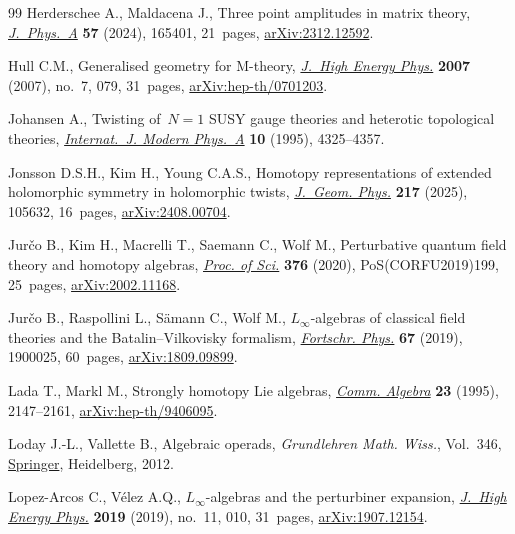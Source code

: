 \begin{thebibliography}{99}
Herderschee A., Maldacena J., Three point amplitudes in matrix theory,
 \href{https://doi.org/10.1088/1751-8121/ad389b}{\textit{J.~Phys.~A}}
 \textbf{57} (2024), 165401, 21~pages,
 \href{http://arxiv.org/abs/2312.12592}{arXiv:2312.12592}.

Hull C.M., Generalised geometry for {M}-theory,
 \href{https://doi.org/10.1088/1126-6708/2007/07/079}{\textit{J.~High Energy
 Phys.}} \textbf{2007} (2007), no.~7, 079, 31~pages,
 \href{http://arxiv.org/abs/hep-th/0701203}{arXiv:hep-th/0701203}.

Johansen A., Twisting of~{$N=1$} {SUSY} gauge theories and heterotic
 topological theories,
 \href{https://doi.org/10.1142/S0217751X9500200X}{\textit{Internat.~J. Modern
 Phys.~A}} \textbf{10} (1995), 4325--4357.

Jonsson D.S.H., Kim H., Young C.A.S., Homotopy representations of extended
 holomorphic symmetry in holomorphic twists,
 \href{https://doi.org/10.1016/j.geomphys.2025.105632}{\textit{J.~Geom.
 Phys.}} \textbf{217} (2025), 105632, 16~pages,
 \href{http://arxiv.org/abs/2408.00704}{arXiv:2408.00704}.

Jur\v{c}o B., Kim H., Macrelli T., Saemann C., Wolf M., Perturbative quantum
 field theory and homotopy algebras,
 \href{https://doi.org/10.22323/1.376.0199}{\textit{Proc. of Sci.}}
 \textbf{376} (2020), PoS(CORFU2019)199, 25~pages,
 \href{http://arxiv.org/abs/2002.11168}{arXiv:2002.11168}.

Jur\v{c}o B., Raspollini L., S\"amann C., Wolf M., {$L_\infty$}-algebras of
 classical field theories and the {B}atalin--{V}ilkovisky formalism,
 \href{https://doi.org/10.1002/prop.201900025}{\textit{Fortschr. Phys.}}
 \textbf{67} (2019), 1900025, 60~pages,
 \href{http://arxiv.org/abs/1809.09899}{arXiv:1809.09899}.

Lada T., Markl M., Strongly homotopy {L}ie algebras,
 \href{https://doi.org/10.1080/00927879508825335}{\textit{Comm. Algebra}}
 \textbf{23} (1995), 2147--2161,
 \href{http://arxiv.org/abs/hep-th/9406095}{arXiv:hep-th/9406095}.

Loday J.-L., Vallette B., Algebraic operads, \textit{Grundlehren Math. Wiss.},
 Vol.~346, \href{https://doi.org/10.1007/978-3-642-30362-3}{Springer},
 Heidelberg, 2012.

Lopez-Arcos C., V\'elez A.Q., {$L_\infty$}-algebras and the perturbiner
 expansion, \href{https://doi.org/10.1007/jhep11(2019)010}{\textit{J.~High
 Energy Phys.}} \textbf{2019} (2019), no.~11, 010, 31~pages,
 \href{http://arxiv.org/abs/1907.12154}{arXiv:1907.12154}.


\end{thebibliography}

